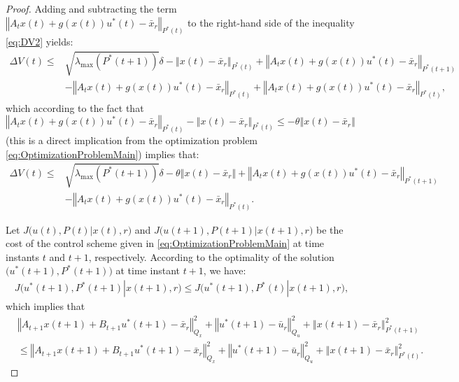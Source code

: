 \documentclass[1p,times]{elsarticle}
\begin{document}
\begin{proof}
Adding and subtracting the term $\left\Vert A_tx(t)+g\left(x(t)\right)u^\ast(t)-\bar{x}_r\right\Vert_{P^\ast(t)}$ to the right-hand side of the inequality \eqref{eq:DV2} yields:
\begin{align}\label{eq:DV3}
\Delta V(t)\leq&\sqrt{\lambda_{\text{max}}\left(P^\ast(t+1)\right)}\delta-\left\Vert x(t)-\bar{x}_r\right\Vert_{P^\ast(t)}
+\left\Vert A_tx(t)+g\left(x(t)\right)u^\ast(t)-\bar{x}_r\right\Vert_{P^\ast(t+1)}\nonumber\\
&-\left\Vert A_tx(t)+g\left(x(t)\right)u^\ast(t)-\bar{x}_r\right\Vert_{P^\ast(t)}
+\left\Vert A_tx(t)+g\left(x(t)\right)u^\ast(t)-\bar{x}_r\right\Vert_{P^\ast(t)},
\end{align}
which according to the fact that $\left\Vert A_tx(t)+g\left(x(t)\right)u^\ast(t)-\bar{x}_r\right\Vert_{P^\ast(t)}-\left\Vert x(t)-\bar{x}_r\right\Vert_{P^\ast(t)}\leq-\theta\left\Vert x(t)-\bar{x}_r\right\Vert$ (this is a direct implication from the optimization problem \eqref{eq:OptimizationProblemMain}) implies that:
\begin{align}\label{eq:DV4}
\Delta V(t)\leq&\sqrt{\lambda_{\text{max}}\left(P^\ast(t+1)\right)}\delta-\theta\left\Vert x(t)-\bar{x}_r\right\Vert\nonumber
+\left\Vert A_tx(t)+g\left(x(t)\right)u^\ast(t)-\bar{x}_r\right\Vert_{P^\ast(t+1)}\nonumber\\
&-\left\Vert A_tx(t)+g\left(x(t)\right)u^\ast(t)-\bar{x}_r\right\Vert_{P^\ast(t)}.
\end{align}



Let $J\big(u(t),P(t)|x(t),r\big)$ and $J\big(u(t+1),P(t+1)|x(t+1),r\big)$ be the cost of the control scheme given in \eqref{eq:OptimizationProblemMain} at time instants $t$ and $t+1$, respectively. According to the optimality of the solution $\big(u^\ast(t+1),P^\ast(t+1)\big)$ at time instant $t+1$, we have:
\begin{align}\label{eq:Optimality1}
J\big(u^\ast(t+1),P^\ast(t+1)|x(t+1),r\big)\leq 
J\big(u^\ast(t+1),P^\ast(t)|x(t+1),r\big),
\end{align}
which implies that
\begin{align}
&\left\Vert A_{t+1}x(t+1)+B_{t+1}u^\ast(t+1)-\bar{x}_r\right\Vert^2_{Q_x}+\left\Vert u^\ast(t+1)-\bar{u}_r\right\Vert^2_{Q_u}\nonumber
+\left\Vert x(t+1)-\bar{x}_r\right\Vert_{P^\ast(t+1)}^2\\
&\leq\left\Vert A_{t+1}x(t+1)+B_{t+1}u^\ast(t+1)-\bar{x}_r\right\Vert^2_{Q_x}
+\left\Vert u^\ast(t+1)-\bar{u}_r\right\Vert^2_{Q_u}+\left\Vert x(t+1)-\bar{x}_r\right\Vert_{P^\ast(t)}^2.
\end{align}


\end{proof}
\end{document}

